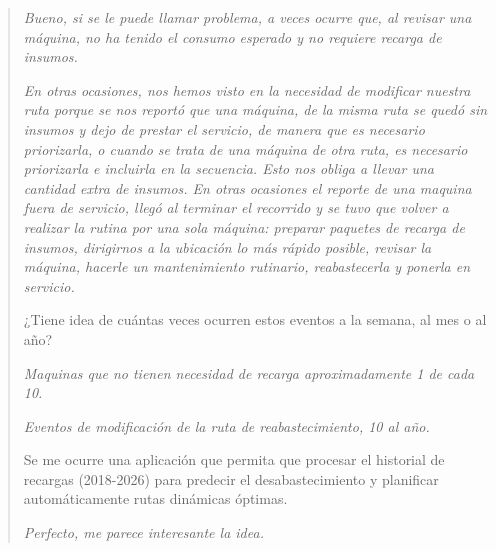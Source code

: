 \begin{quote}
\emph{Bueno, si se le puede llamar problema, a veces ocurre que, al revisar una máquina, no ha tenido el consumo esperado y no requiere recarga de insumos.}

\emph{En otras ocasiones, nos hemos visto en la necesidad de modificar nuestra ruta porque se nos reportó que una máquina, de la misma ruta se quedó sin insumos y dejo de prestar el servicio, de manera que es necesario priorizarla, o cuando se trata de una máquina de otra ruta, es necesario priorizarla e incluirla en la secuencia. Esto nos obliga a llevar una cantidad extra de insumos. En otras ocasiones el reporte de una maquina fuera de servicio, llegó al terminar el recorrido y se tuvo que volver a realizar la rutina por una sola máquina: preparar paquetes de recarga de insumos, dirigirnos a la ubicación lo más rápido posible, revisar la máquina, hacerle un mantenimiento rutinario, reabastecerla y ponerla en servicio.}

¿Tiene idea de cuántas veces ocurren estos eventos a la semana, al mes o al año?

\emph{Maquinas que no tienen necesidad de recarga aproximadamente 1 de cada 10.}

\emph{Eventos de modificación de la ruta de reabastecimiento, 10 al año.}

Se me ocurre una aplicación que permita que procesar el historial de recargas (2018-2026) para predecir el desabastecimiento y planificar automáticamente rutas dinámicas óptimas.

\emph{Perfecto, me parece interesante la idea.}
\end{quote}
